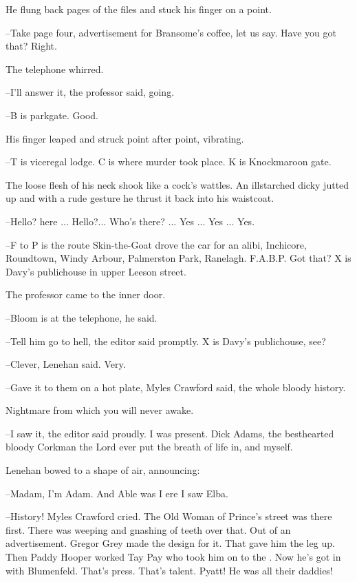 He flung back pages of the files
and stuck his finger on a point.

--Take page four,
advertisement for Bransome's coffee,
let us say.
Have you got that?
Right.

The telephone whirred.



--I'll answer it,
the professor said,
going.

--B is parkgate.
Good.

His finger leaped and struck point after point,
vibrating.

--T is viceregal lodge.
C is where murder took place.
K is Knockmaroon gate.

The loose flesh of his neck shook like a cock's wattles.
An illstarched dicky jutted up
and with a rude gesture
he thrust it back into his waistcoat.

--Hello?
 here ...
Hello?...
Who's there? ...
Yes ...
Yes ...
Yes.

--F to P is the route Skin-the-Goat drove the car for an alibi,
Inchicore, Roundtown, Windy Arbour, Palmerston Park, Ranelagh.
F.A.B.P.
Got that?
X is Davy's publichouse in upper Leeson street.

The professor came to the inner door.

--Bloom is at the telephone,
he said.

--Tell him go to hell,
the editor said promptly.
X is Davy's publichouse,
see?



--Clever,
Lenehan said.
Very.

--Gave it to them on a hot plate,
Myles Crawford said,
the whole bloody history.

Nightmare from which you will never awake.

--I saw it,
the editor said proudly.
I was present.
Dick Adams, the besthearted bloody Corkman the Lord ever put the breath of life in,
and myself.

Lenehan bowed to a shape of air,
announcing:

--Madam,
I'm Adam.
And Able was I ere I saw Elba.

--History!
Myles Crawford cried.
The Old Woman of Prince's street was there first.
There was weeping and gnashing of teeth over that.
Out of an advertisement.
Gregor Grey made the design for it.
That gave him the leg up.
Then Paddy Hooper worked Tay Pay who took him on to the .
Now he's got in with Blumenfeld.
That's press.
That's talent.
Pyatt!
He was all their daddies!

